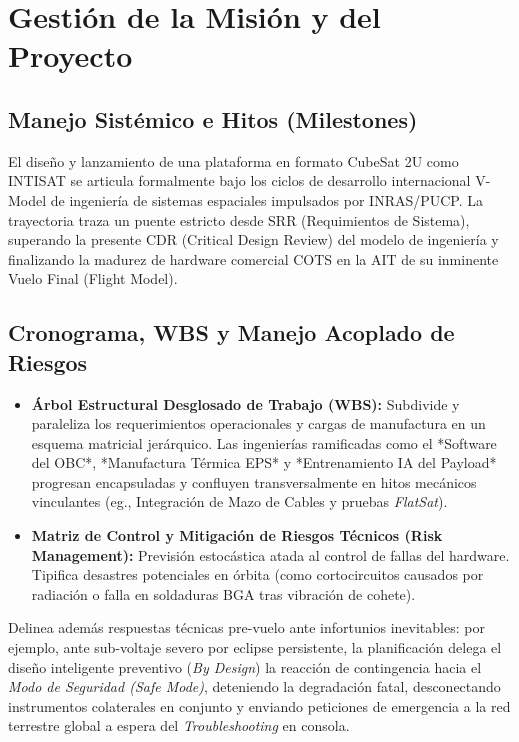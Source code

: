 \chapter{Gestión de la Misión y del Proyecto}

\section{Manejo Sistémico e Hitos (Milestones)}
El diseño y lanzamiento de una plataforma en formato CubeSat 2U como INTISAT se articula formalmente bajo los ciclos de desarrollo internacional V-Model de ingeniería de sistemas espaciales impulsados por INRAS/PUCP. La trayectoria traza un puente estricto desde SRR (Requimientos de Sistema), superando la presente CDR (Critical Design Review) del modelo de ingeniería y finalizando la madurez de hardware comercial COTS en la AIT de su inminente Vuelo Final (Flight Model).

\section{Cronograma, WBS y Manejo Acoplado de Riesgos}
\begin{itemize}
    \item \textbf{Árbol Estructural Desglosado de Trabajo (WBS):} Subdivide y paraleliza los requerimientos operacionales y cargas de manufactura en un esquema matricial jerárquico. Las ingenierías ramificadas como el *Software del OBC*, *Manufactura Térmica EPS* y *Entrenamiento IA del Payload* progresan encapsuladas y confluyen transversalmente en hitos mecánicos vinculantes (eg., Integración de Mazo de Cables y pruebas \textit{FlatSat}).
    
    \item \textbf{Matriz de Control y Mitigación de Riesgos Técnicos (Risk Management):} Previsión estocástica atada al control de fallas del hardware. Tipifica desastres potenciales en órbita (como cortocircuitos causados por radiación o falla en soldaduras BGA tras vibración de cohete). 
\end{itemize}

Delinea además respuestas técnicas pre-vuelo ante infortunios inevitables: por ejemplo, ante sub-voltaje severo por eclipse persistente, la planificación delega el diseño inteligente preventivo (\textit{By Design}) la reacción de contingencia hacia el \textit{Modo de Seguridad (Safe Mode)}, deteniendo la degradación fatal, desconectando instrumentos colaterales en conjunto y enviando peticiones de emergencia a la red terrestre global a espera del \textit{Troubleshooting} en consola.
